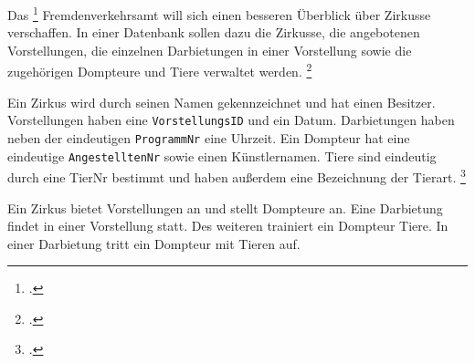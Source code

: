 \documentclass{bschlangaul-aufgabe}
\begin{document}

Das
\footcite[Thema 2 Aufgabe 2 Seite 11]{examen:66116:2018:03}
Fremdenverkehrsamt will sich einen besseren Überblick über Zirkusse
verschaffen. In einer Datenbank sollen dazu die Zirkusse, die
angebotenen Vorstellungen, die einzelnen Darbietungen in einer
Vorstellung sowie die zugehörigen Dompteure und Tiere verwaltet werden.
\footcite[Seite 1-2, Aufgabe 1: ER-Diagramm Einstieg]{db:pu:1}

Ein Zirkus wird durch seinen Namen gekennzeichnet und hat einen
Besitzer. Vorstellungen haben eine \texttt{VorstellungsID} und ein
Datum. Darbietungen haben neben der eindeutigen \texttt{ProgrammNr} eine
Uhrzeit. Ein Dompteur hat eine eindeutige \texttt{AngestelltenNr} sowie
einen Künstlernamen. Tiere sind eindeutig durch eine TierNr bestimmt und
haben außerdem eine Bezeichnung der Tierart.
\footcite[Aufgabe 2, I. Das Entity-Relationship Modell, Seite 6]{examen:66114:2008:03}

Ein Zirkus bietet Vorstellungen an und stellt Dompteure an. Eine
Darbietung findet in einer Vorstellung statt. Des weiteren trainiert ein
Dompteur Tiere. In einer Darbietung tritt ein Dompteur mit Tieren auf.
\end{document}
